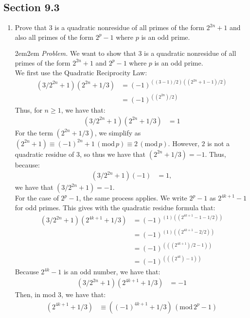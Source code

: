 \documentclass[10pt,oneside]{book}
\newcommand{\gspc}{\vspace{0.13cm}} %
\newcommand{\gline}{\gspc\\} %
\newcommand{\gmod}[1]{\,(\text{mod}\,#1)}
\let\endoldproof\endproof
\newenvironment{problem}[1]
  {\vspace{-0.1cm}\begin{coloredadjust}\begin{adjustwidth}{2em}{2em}
   \textit{Problem. }#1}
  {\endoldproof
\end{adjustwidth}\end{coloredadjust}\gspc}
\begin{document}
\newcommand{\cg}[1]{\color{OliveGreen}#1\color{white}}
\newcommand{\cb}[1]{\color{BlueViolet}#1\color{white}}

\subsection*{Section 9.3}
\begin{enumerate}
  \item Prove that 3 is a quadratic nonresidue of all primes of the form $2^{2n}+1$ and also all primes of the form $2^p - 1$ where $p$ is an odd prime. 
  \begin{problem}
    We want to show that 3 is a quadratic nonresidue of all primes of the form $2^{2n}+1$ and $2^p -1$ where $p$ is an odd prime. \gline
    We first use the Quadratic Reciprocity Law:
    \begin{align*}
      (3/2^{2n}+1)(2^{2n}+1/3)&=(-1)^{((3-1)/2)((2^{2n}+1-1)/2)}\\
      &=(-1)^{((2^{2n})/2)}
    \end{align*}
    Thus, for $n\ge 1$, we have that:
    \begin{align*}
      (3/2^{2n}+1)(2^{2n}+1/3)&= 1
    \end{align*}
    For the term $(2^{2n}+1/3)$, we simplify as $(2^{2n}+1)\equiv (-1)^{2n}+1\gmod p\equiv 2\gmod p$. However, $2$ is not a quadratic residue of 3, so thus we have that $(2^{2n}+1/3) = -1$. Thus, because:
    \begin{align*}
      (3/2^{2n}+1)(-1)&= 1, 
    \end{align*}
    we have that $(3/2^{2n}+1) = -1$.\gline
    For the case of $2^{p}-1$, the same process applies. We write $2^{p}-1$ as $2^{4k + 1}-1$ for odd primes. This gives with the quadratic residue formula that:
    \begin{align*}
      (3/2^{2n}+1)(2^{4k+1}+1/3)&= (-1)^{(1)((2^{4k+1}-1-1/2))}\\
      &= (-1)^{(1)((2^{4k+1}-2/2))}\\
      &= (-1)^{(((2^{4k+1})/2-1))}\\
      &= (-1)^{(((2^{4k})-1))}
    \end{align*}
    Because $2^{4k}-1$ is an odd number, we have that:
    \begin{align*}
      (3/2^{2n}+1)(2^{4k+1}+1/3)&=-1
    \end{align*}
    Then, in mod 3, we have that:
    \begin{align*}
      (2^{4k+1}+1/3)&\equiv ((-1)^{4k+1}+1/3)\gmod {2^{p}-1}\\

\end{align*}
\end{problem}
\end{enumerate}
\end{document}
